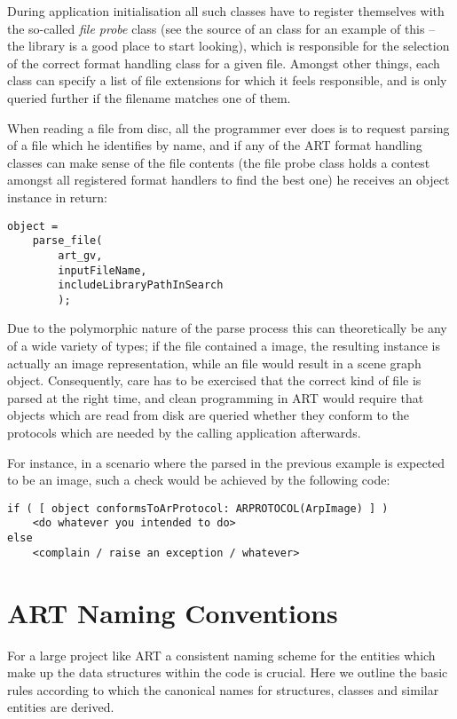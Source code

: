 During application initialisation all such classes have to register
themselves with the so-called \emph{file probe} class (see the source
of an  class for an example of this -- the
 library is a good place to start looking), which is
responsible for the selection of the correct format handling class for
a given file. Amongst other things, each  class can
specify a list of file extensions for which it feels responsible, and
is only queried further if the filename matches one of them.

When reading a file from disc, all the programmer ever does is to request
parsing of a file which he identifies by name, and if any of the ART format
handling classes can make sense of the file contents (the file probe class holds
a contest amongst all registered format handlers to find the best one) he
receives an object instance in return:
\begin{verbatim}
object =
    parse_file(
        art_gv,
        inputFileName,
        includeLibraryPathInSearch
        );
\end{verbatim}
Due to the polymorphic nature of the parse process this  can
theoretically be any of a wide variety of types; if the file contained a
 image, the resulting instance is actually an image
representation, while an  file would result in a scene graph
object. Consequently, care has to be exercised that the correct kind of file is
parsed at the right time, and clean programming in ART would require that
objects which are read from disk are queried whether they conform to the
protocols which are needed by the calling application afterwards. 

For instance, in a scenario where the  parsed in the previous
example is expected to be an image, such a check would be achieved by the
following code: 
\begin{verbatim}
if ( [ object conformsToArProtocol: ARPROTOCOL(ArpImage) ] )
    <do whatever you intended to do>
else
    <complain / raise an exception / whatever> 
\end{verbatim}


\chapter{ART Naming Conventions}
\label{sec:Background:Naming}
For a large project like ART a consistent naming scheme for the entities which
make up the data structures within the code is crucial. Here we outline the basic
rules according to which the canonical names for structures, classes and similar
entities are derived.

